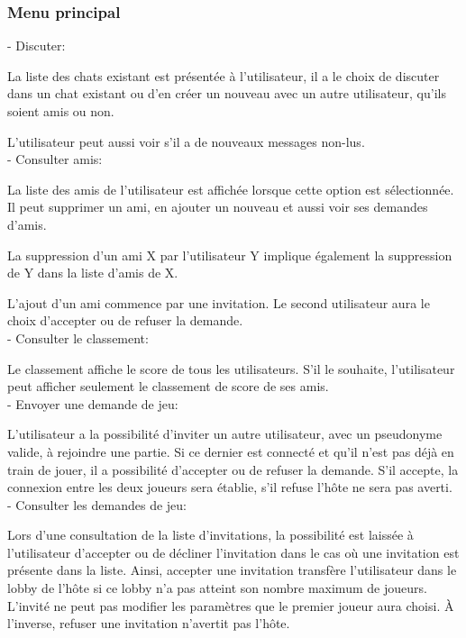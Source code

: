 \documentclass[a4paper,12pt]{article}
\begin{document}
\subsubsection{Menu principal}

- Discuter:

La liste des chats existant est présentée à l'utilisateur, il a le choix de discuter dans un chat existant ou d'en créer un nouveau avec un autre utilisateur, qu'ils soient amis ou non. 

L'utilisateur peut aussi voir s'il a de nouveaux messages non-lus.\\

- Consulter amis:

La liste des amis de l'utilisateur est affichée lorsque cette option est sélectionnée. Il peut supprimer un ami, en ajouter un nouveau et aussi voir ses demandes d'amis. 

La suppression d'un ami X par l'utilisateur Y implique également la suppression de Y dans la liste d'amis de X. 

L'ajout d'un ami commence par une invitation. Le second utilisateur aura le choix d'accepter ou de refuser la demande. \\

- Consulter le classement:

Le classement affiche le score de tous les utilisateurs. S'il le souhaite, l'utilisateur peut afficher seulement le classement de score de ses amis. \\

- Envoyer une demande de jeu:

L’utilisateur a la possibilité d’inviter un autre utilisateur, avec un pseudonyme valide, à rejoindre une partie. Si ce dernier est connecté et qu’il n’est pas déjà en train de jouer, il a possibilité d’accepter ou de refuser la demande. S’il accepte, la connexion entre les deux joueurs sera établie, s’il refuse l’hôte ne sera pas averti. \\

- Consulter les demandes de jeu:

Lors d’une consultation de la liste d’invitations, la possibilité est laissée à l’utilisateur d’accepter ou de décliner l’invitation dans le cas où une invitation est présente dans la liste. Ainsi, accepter une invitation transfère l’utilisateur dans le lobby de l’hôte si ce lobby n’a pas atteint son nombre maximum de joueurs. L’invité ne peut pas modifier les paramètres que le premier joueur aura choisi. À l’inverse, refuser une invitation n’avertit pas l’hôte. \\
\end{document}
